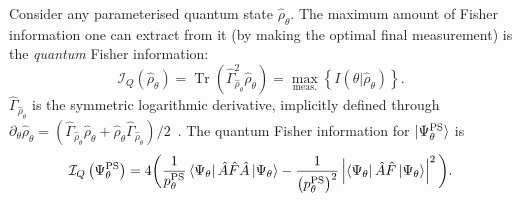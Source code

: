 \documentclass[%
 reprint,
superscriptaddress,
nofootinbib,
bibnotes,
 amsmath,amssymb,
 aps,
]{revtex4-1}
\theoremstyle{plain}
\DeclareMathOperator{\Tr}{Tr}
\newcommand{\pps}{p_{\theta}^{\mathrm{PS}}}
\newcommand{\Pt}{\partial_{\theta}}
\newcommand{\PsiT}{\Psi_{\theta}}
\newcommand{\PsT}{\Psi_{\theta}^{\mathrm{PS}}}
\begin{document}
Consider any parameterised quantum state $\hat{\rho}_{\theta}$. The maximum amount of Fisher information one can extract from it (by making the optimal final measurement) is the \textit{quantum} Fisher information:
\begin{equation}
\mathcal{I}_Q \left( \hat{\rho}_{\theta} \right) = \Tr \left( \hat{\Gamma}^2_{\hat{\rho}_{\theta}} \hat{\rho}_{\theta} \right) = \max_{\mathrm{meas.}} \left\{ I\left( \theta|\hat{\rho}_{\theta} \right) \right\} .
\end{equation}
$\hat{\Gamma}_{\hat{\rho}_{\theta}}$ is the symmetric logarithmic derivative, implicitly defined through $\Pt \hat{\rho}_{\theta} = \left( \hat{\Gamma}_{\hat{\rho}_{\theta}} \hat{\rho}_{\theta} + \hat{\rho}_{\theta} \hat{\Gamma}_{\hat{\rho}_{\theta}} \right)/2$~\cite{Helstrom76, Braunstein94}.  
The quantum Fisher information for $\ket{\PsT}$ is
\begin{align}
\label{Eq:PSFish}
\mathcal{I}_Q \left( \PsT \right) 
=  4 \bigg( \frac{1}{\pps} \bra{\PsiT} \hat{A} \hat{F} \hat{A} \ket{\PsiT} - \frac{1}{\left( \pps \right)^2} \left| \bra{\PsiT} \hat{A} \hat{F}  \ket{\PsiT} \right|^2 \bigg) .
\end{align}
\end{document}
